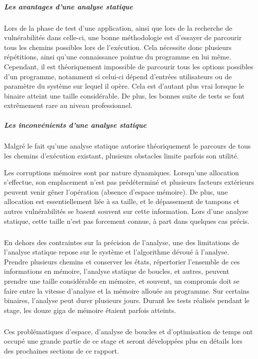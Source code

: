 \subparagraph{Les avantages d'une analyse statique}

Lors de la phase de test d'une application, ainsi que lors de la recherche de vulnérabilités dans celle-ci, une bonne méthodologie
est d'essayer de parcourir tous les chemins possibles lors de l'exécution. Cela nécessite donc plusieurs répétitions, ainsi qu'une connaissance
pointue du programme en lui même.\newline
Cependant, il est théoriquement impossible de parcourir tous les options possibles d'un programme, notamment si
celui-ci dépend d'entrées utilisateurs ou de paramètre du système sur lequel il opère. Cela est d'autant plus vrai lorsque le binaire atteint une taille
considérable. De plus, les bonnes suite de tests se font extrêmement rare au niveau professionnel.

\subparagraph{Les inconvénients d'une analyse statique}

Malgré le fait qu'une analyse statique autorise théoriquement le parcours de tous les chemins d'exécution existant, plusieurs obstacles
limite parfois son utilité.\newline

Les corruptions mémoires sont par nature dynamiques. Lorsqu'une allocation s'effectue, son emplacement n'est pas prédéterminé
et plusieurs facteurs extérieurs peuvent venir gêner l'opération (absence d'espace mémoire). De plus, une allocation
est essentiellement liée à sa taille, et le dépassement de tampons et autres vulnérabilités se basent souvent sur cette information.
Lors d'une analyse statique, cette taille n'est pas forcement connue, à part dans quelques cas précis.
\subparagraph{}

En dehors des contraintes sur la précision de l'analyse, une des limitations de l'analyse statique repose sur le système et l'algorithme
dévoué à l'analyse. Prendre plusieurs chemins et conserver les états, répertorier l'ensemble de ces informations en mémoire, l'analyse
statique de boucles, et autres, peuvent prendre une taille considérable en mémoire, et souvent, un compromis doit se faire entre la vitesse
d'analyse et la mémoire allouée au programme. Sur certains binaires, l'analyse peut durer plusieurs jours. Durant les tests réalisés pendant le
stage, les douze giga de mémoire étaient parfois atteints.
\subparagraph{}
Ces problématiques d'espace, d'analyse de boucles et d'optimisation de temps ont occupé une grande partie de ce stage et seront développées plus
en détails lors des prochaines sections de ce rapport.

